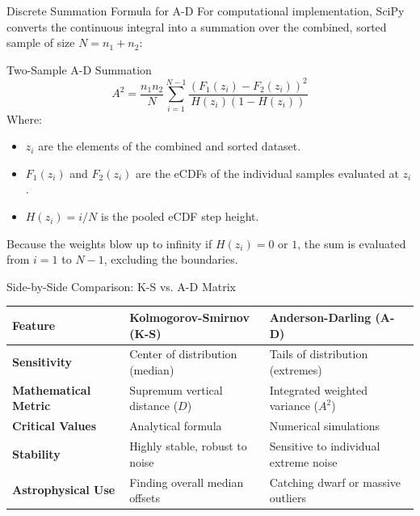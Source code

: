 \documentclass[9pt]{beamer}
\begin{document}
\begin{frame}{Discrete Summation Formula for A-D}
  For computational implementation, SciPy converts the continuous integral into a summation over the combined, sorted sample of size $N = n_1 + n_2$:
  \begin{block}{Two-Sample A-D Summation}
    $$A^2 = \frac{n_1 n_2}{N} \sum_{i=1}^{N-1} \frac{\left( F_1(z_i) - F_2(z_i) \right)^2}{H(z_i)(1 - H(z_i))}$$
    Where:
    \begin{itemize}
      \item $z_i$ are the elements of the combined and sorted dataset.
      \item $F_1(z_i)$ and $F_2(z_i)$ are the eCDFs of the individual samples evaluated at $z_i$.
      \item $H(z_i) = i / N$ is the pooled eCDF step height.
    \end{itemize}
  \end{block}
  Because the weights blow up to infinity if $H(z_i) = 0$ or $1$, the sum is evaluated from $i=1$ to $N-1$, excluding the boundaries.
\end{frame}

\begin{frame}{Side-by-Side Comparison: K-S vs. A-D Matrix}
  \begin{table}
    \centering
    \begin{tabular}{lll}
      \toprule
      Feature & Kolmogorov-Smirnov (K-S) & Anderson-Darling (A-D) \\
      \midrule
      \textbf{Sensitivity} & Center of distribution (median) & Tails of distribution (extremes) \\
      \textbf{Mathematical Metric} & Supremum vertical distance ($D$) & Integrated weighted variance ($A^2$) \\
      \textbf{Critical Values} & Analytical formula & Numerical simulations \\
      \textbf{Stability} & Highly stable, robust to noise & Sensitive to individual extreme noise \\
      \textbf{Astrophysical Use} & Finding overall median offsets & Catching dwarf or massive outliers \\
      \bottomrule
    \end{tabular}
  \end{table}
\end{frame}
\end{document}
